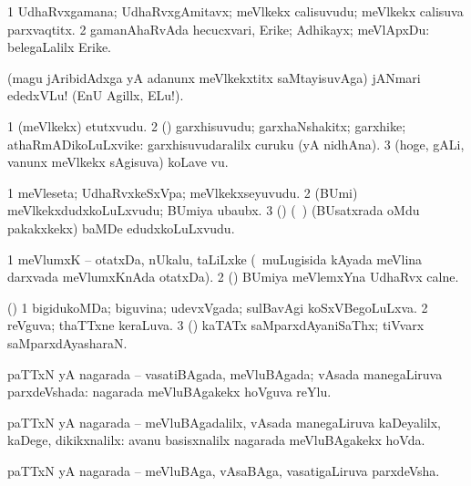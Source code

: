 {{\bentry
{} 
\gl{\nA}
\bmng
\bnum
\num{1} UdhaRvxgamana; UdhaRvxgAmitavx; meVlkekx calisuvudu; meVlkekx calisuva parxvaqtitx. 
\num{2} gamanAhaRvAda hecucxvari, Erike; Adhikayx; meVlApxDu:  belegaLalilx Erike. 
\enum
\emng
\eentry

\bentry
{} 
\gl{\BAavayx}
\expl{}
\bmng
(magu jAribidAdxga yA adanunx meVlkekxtitx saMtayisuvAga) jANmari ededxVLu! (EnU Agillx, ELu!). 
\emng
\eentry

\bentry
{} 
\gl{\nA}
\expl{}
\bmng
\bnum
\num{1} (meVlkekx) etutxvudu. 
\num{2} (\AmA) garxhisuvudu; garxhaNshakitx; garxhike; athaRmADikoLuLxvike:  garxhisuvudaralilx curuku (yA nidhAna). 
\num{3} (hoge, gALi, \mo vanunx meVlkekx sAgisuva) koLave \mo vu. 
\enum
\emng
\eentry

\bentry
{} 
\gl{\nA}
\bmng
\bnum
\num{1} meVleseta; UdhaRvxkeSxVpa; meVlkekxseyuvudu. 
\num{2} (BUmi) meVlkekxdudxkoLuLxvudu; BUmiya ubaubx. 
\num{3} (\BUvi) (\kanmu\ \gaNi) (BUsatxrada oMdu pakakxkekx) baMDe edudxkoLuLxvudu. 
\enum
\emng
\eentry

\bentry
{} 
\gl{\nA}
\expl{}
\bmng
\bnum
\num{1} meVlumxK -- otatxDa, nUkalu, taLiLxke (\udA\ muLugisida kAyada meVlina darxvada meVlumxKnAda otatxDa). 
\num{2} (\BUvi) BUmiya meVlemxYna UdhaRvx calne. 
\enum
\emng
\eentry

\bentry
{} 
\gl{\gu}
\expl{}
\bmng
(\AmA) 
\bnum
\num{1} bigidukoMDa; biguvina; udevxVgada; sulBavAgi koSxVBegoLuLxva. 
\num{2} reVguva; thaTTxne keraLuva. 
\num{3} (\ame) kaTATx saMparxdAyaniSaThx; tiVvarx saMparxdAyasharaN. 
\enum
\emng
\eentry

\bentry
{} 
\gl{\gu}
\expl{}
\bmng
paTTxN yA nagarada -- vasatiBAgada, meVluBAgada; vAsada manegaLiruva parxdeVshada:  nagarada meVluBAgakekx hoVguva reYlu. 
\emng
\eentry

\bentry
{} 
\gl{\kirxvi}
\expl{}
\bmng
paTTxN yA nagarada -- meVluBAgadalilx, vAsada manegaLiruva kaDeyalilx, kaDege, dikikxnalilx:  avanu basisxnalilx nagarada meVluBAgakekx hoVda. 
\emng
\eentry

\bentry
{} 
\gl{\nA}
\expl{}
\bmng
paTTxN yA nagarada -- meVluBAga, vAsaBAga, vasatigaLiruva parxdeVsha. 
\emng
\eentry

}}
